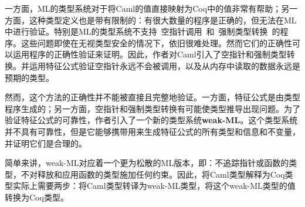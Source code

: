 \documentclass[a4paper,11pt]{article}
\begin{document}
一方面，ML的类型系统对于将Caml的值直接映射为Coq中的值非常有帮助；另一方面，这种类型定义也是带有限制的：有很大数量的程序是正确的，但无法在ML中进行验证。特别是ML的类型系统不支持~空指针调用~和~强制类型转换~的程序。这些问题即使在无视类型安全的情况下，依旧很难处理。然而它们的正确性可以运用程序的正确性验证来证明。因此，作者对Caml引入了空指针和强制类型转换。并运用特征公式验证空指针永远不会被调用，以及从内存中读取的数据永远是预期的类型。

然而，这个方法的正确性并不能被直接且完整地验证。一方面，特征公式是由类型程序生成的；另一方面，空指针和强制类型转换有可能使类型推导出现问题。为了验证特征公式的可靠性，作者引入了一个新的类型系统\textbf{weak-ML}。这个类型系统并不具有可靠性，但是它能够携带用来生成特征公式的所有类型和信息和不变量，并证明它们是合理的。

简单来讲，weak-ML对应着一个更为松散的ML版本，即：不追踪指针或函数的类型，不对释放和应用函数的类型施加任何约束。因此，将Caml类型解释为Coq类型实际上需要两步：将Caml类型转译为weak-ML类型，将这个weak-ML类型的值转换为Coq类型。
\end{document}
